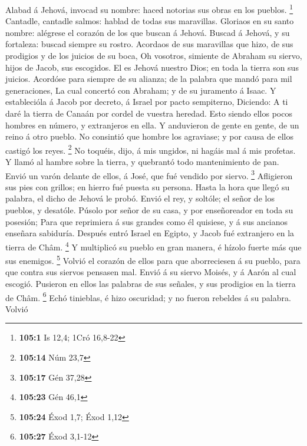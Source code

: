  Alabad á Jehová, invocad su nombre: haced notorias sus
obras en los pueblos. \footnote{\textbf{105:1} Is 12,4; 1Cró 16,8-22}
 Cantadle, cantadle salmos: hablad de todas sus maravillas.
 Gloriaos en su santo nombre: alégrese el corazón de los que
buscan á Jehová.  Buscad á Jehová, y su fortaleza: buscad
siempre su rostro.  Acordaos de sus maravillas que hizo, de
sus prodigios y de los juicios de su boca,  Oh vosotros,
simiente de Abraham su siervo, hijos de Jacob, sus escogidos.
 El es Jehová nuestro Dios; en toda la tierra son sus
juicios.  Acordóse para siempre de su alianza; de la palabra
que mandó para mil generaciones,  La cual concertó con
Abraham; y de su juramento á Isaac.  Y establecióla á Jacob
por decreto, á Israel por pacto sempiterno,  Diciendo: A ti
daré la tierra de Canaán por cordel de vuestra heredad. 
Esto siendo ellos pocos hombres en número, y extranjeros en ella.
 Y anduvieron de gente en gente, de un reino á otro pueblo.
 No consintió que hombre los agraviase; y por causa de
ellos castigó los reyes. \footnote{\textbf{105:14} Núm 23,7}
 No toquéis, dijo, á mis ungidos, ni hagáis mal á mis
profetas.  Y llamó al hambre sobre la tierra, y quebrantó
todo mantenimiento de pan.  Envió un varón delante de
ellos, á José, que fué vendido por siervo. \footnote{\textbf{105:17} Gén
  37,28}  Afligieron sus pies con grillos; en hierro fué
puesta su persona.  Hasta la hora que llegó su palabra, el
dicho de Jehová le probó.  Envió el rey, y soltóle; el
señor de los pueblos, y desatóle.  Púsolo por señor de su
casa, y por enseñoreador en toda su posesión;  Para que
reprimiera á sus grandes como él quisiese, y á sus ancianos enseñara
sabiduría.  Después entró Israel en Egipto, y Jacob fué
extranjero en la tierra de Châm. \footnote{\textbf{105:23} Gén 46,1}
 Y multiplicó su pueblo en gran manera, é hízolo fuerte más
que sus enemigos. \footnote{\textbf{105:24} Éxod 1,7; Éxod 1,12}
 Volvió el corazón de ellos para que aborreciesen á su
pueblo, para que contra sus siervos pensasen mal.  Envió á
su siervo Moisés, y á Aarón al cual escogió.  Pusieron en
ellos las palabras de sus señales, y sus prodigios en la tierra de Châm.
\footnote{\textbf{105:27} Éxod 3,1-12}  Echó tinieblas, é
hizo oscuridad; y no fueron rebeldes á su palabra.  Volvió

